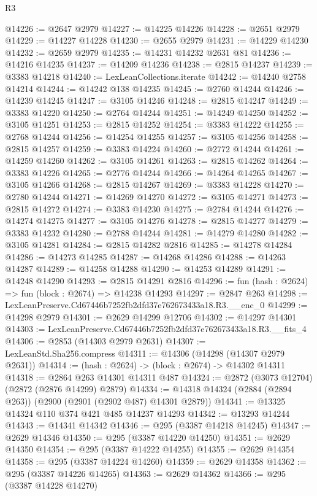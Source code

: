 \begin{lexlean}{R3}
\begin{coremodule}
@14226 := @2647 @2979
@14227 := @14225 @14226
@14228 := @2651 @2979
@14229 := @14227 @14228
@14230 := @2655 @2979
@14231 := @14229 @14230
@14232 := @2659 @2979
@14235 := @14231 @14232 @2631 @81
@14236 := @14216 @14235
@14237 := @14209 @14236
@14238 := @2815 @14237
@14239 := @3383 @14218
@14240 := LexLeanCollections.iterate
@14242 := @14240 @2758 @14214
@14244 := @14242 @138 @14235
@14245 := @2760 @14244
@14246 := @14239 @14245
@14247 := @3105 @14246
@14248 := @2815 @14247
@14249 := @3383 @14220
@14250 := @2764 @14244
@14251 := @14249 @14250
@14252 := @3105 @14251
@14253 := @2815 @14252
@14254 := @3383 @14222
@14255 := @2768 @14244
@14256 := @14254 @14255
@14257 := @3105 @14256
@14258 := @2815 @14257
@14259 := @3383 @14224
@14260 := @2772 @14244
@14261 := @14259 @14260
@14262 := @3105 @14261
@14263 := @2815 @14262
@14264 := @3383 @14226
@14265 := @2776 @14244
@14266 := @14264 @14265
@14267 := @3105 @14266
@14268 := @2815 @14267
@14269 := @3383 @14228
@14270 := @2780 @14244
@14271 := @14269 @14270
@14272 := @3105 @14271
@14273 := @2815 @14272
@14274 := @3383 @14230
@14275 := @2784 @14244
@14276 := @14274 @14275
@14277 := @3105 @14276
@14278 := @2815 @14277
@14279 := @3383 @14232
@14280 := @2788 @14244
@14281 := @14279 @14280
@14282 := @3105 @14281
@14284 := @2815 @14282 @2816
@14285 := @14278 @14284
@14286 := @14273 @14285
@14287 := @14268 @14286
@14288 := @14263 @14287
@14289 := @14258 @14288
@14290 := @14253 @14289
@14291 := @14248 @14290
@14293 := @2815 @14291 @2816
@14296 := fun (hash : @2624) => fun (block : @2674) => @14238 @14293
@14297 := @2847 @263
@14298 := LexLeanPreserve.Cd67446b7252fb2dfd37e762673433a18.R3.__enc_0
@14299 := @14298 @2979
@14301 := @2629 @14299 @12706
@14302 := @14297 @14301
@14303 := LexLeanPreserve.Cd67446b7252fb2dfd37e762673433a18.R3.__fits_4
@14306 := @2853 (@14303 @2979 @2631)
@14307 := LexLeanStd.Sha256.compress
@14311 := @14306 (@14298 (@14307 @2979 @2631))
@14314 := (hash : @2624) -> (block : @2674) -> @14302 @14311
@14318 := @2864 @263 @14301 @14311 @487
@14324 := @2872 (@3073 @12704) (@2872 (@2876 @14299) @2879)
@14334 := @14318 @14324 (@2884 (@2894 @263)) (@2900 (@2901 (@2902 @487) @14301 @2879))
@14341 := @13325 @14324 @110 @374 @421 @485 @14237 @14293
@14342 := @13293 @14244
@14343 := @14341 @14342
@14346 := @295 (@3387 @14218 @14245)
@14347 := @2629 @14346
@14350 := @295 (@3387 @14220 @14250)
@14351 := @2629 @14350
@14354 := @295 (@3387 @14222 @14255)
@14355 := @2629 @14354
@14358 := @295 (@3387 @14224 @14260)
@14359 := @2629 @14358
@14362 := @295 (@3387 @14226 @14265)
@14363 := @2629 @14362
@14366 := @295 (@3387 @14228 @14270)

\end{coremodule}
\end{lexlean}
